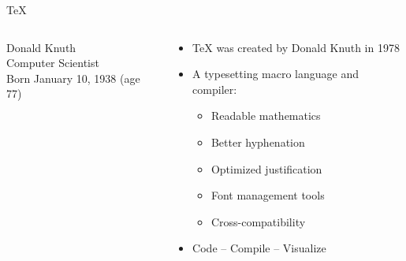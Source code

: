 \begin{frame}{\TeX{}}
	\begin{columns}
		\begin{column}{4cm}
			\begin{figure}
			\end{figure}
			\begin{center}
				\tiny
				Donald Knuth \\
				Computer Scientist \\
				Born January 10, 1938 (age 77) \\
			\end{center}
		\end{column}
		\begin{column}{6cm}
			\begin{itemize}
				\item \TeX{} was created by Donald Knuth in 1978
				\pause
				\item A typesetting macro language and compiler:
				\begin{itemize}
					\item Readable mathematics
					\item Better hyphenation
					\item Optimized justification
					\item Font management tools
					\item Cross-compatibility
				\end{itemize}
				\pause
				\item Code -- Compile -- Visualize
			\end{itemize}
		\end{column}
	\end{columns}
\end{frame}

